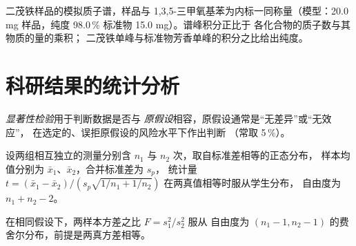 \begin{omfigure}

{\small 二茂铁样品的模拟质子谱，样品与
1,3,5-三甲氧基苯为内标一同称量（模型：20.0 mg 样品，纯度 98.0\,\%
标准物 15.0 mg）。谱峰积分正比于
各化合物的质子数与其物质的量的乘积；
二茂铁单峰与标准物芳香单峰的积分之比给出纯度。}
\end{omfigure}

\section{科研结果的统计分析}

\begin{definition}[显著性检验]\label{def:b3:lab-techniques-3:tests}
\emph{显著性检验}用于判断数据是否与
\emph{原假设}相容，原假设通常是“无差异”或“无效应”，
在选定的、误拒原假设的风险水平下作出判断
（常取 5\,\%）。
\end{definition}

\begin{theorem}[双样本 $t$ 检验]\label{thm:b3:lab-techniques-3:t-test}
设两组相互独立的测量分别含 $n_1$ 与 $n_2$ 次，取自标准差相等的正态分布，
样本均值分别为 $\bar x_1$、$\bar x_2$，合并标准差为 $s_p$，
统计量 $t = (\bar x_1 - \bar x_2)/(s_p\sqrt{1/n_1 + 1/n_2})$ 在两真值相等时服从学生分布，
自由度为 $n_1 + n_2 - 2$。\admitted
\end{theorem}

\begin{proposition}[$F$ 检验]\label{prop:b3:lab-techniques-3:f-test}
在相同假设下，两样本方差之比 $F = s_1^2/s_2^2$ 服从
自由度为 $(n_1 - 1, n_2 - 1)$ 的费舍尔分布，前提是两真方差相等。
\admitted
\end{proposition}

